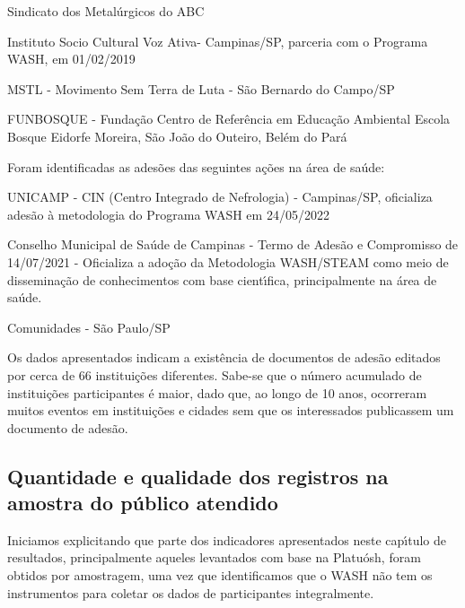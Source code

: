 \documentclass[
12pt,		%
openright,	%
twoside,  %
a4paper,			%
chapter=TITLE,		%
english,			%
french,				%
spanish,			%
brazil				%
]{USPSC-classe/USPSC}
\begin{document}
\begin{alineas}
\item Sindicato dos Metal\'urgicos do ABC
\item Instituto Socio Cultural Voz Ativa- Campinas/SP,  parceria com o Programa WASH, em 01/02/2019
\item MSTL - Movimento Sem Terra de Luta - S\~ao Bernardo do Campo/SP
\item FUNBOSQUE - Funda\c{c}\~ao Centro de Refer\^encia em Educa\c{c}\~ao Ambiental Escola Bosque Eidorfe Moreira, S\~ao Jo\~ao do Outeiro, Bel\'em do Par\'a
\end{alineas}

Foram identificadas as ades\~oes das seguintes a\c{c}\~oes na \'area de sa\'ude:









\begin{alineas}
\item UNICAMP - CIN (Centro Integrado de Nefrologia) - Campinas/SP, oficializa ades\~ao \`a metodologia do Programa WASH em 24/05/2022
\item Conselho Municipal de  Sa\'ude de Campinas - Termo de Ades\~ao e Compromisso de 14/07/2021 - Oficializa a ado\c{c}\~ao da Metodologia WASH/STEAM como meio de dissemina\c{c}\~ao de conhecimentos com base cient\'{\i}fica, principalmente na \'area de sa\'ude.
\item Comunidades - S\~ao Paulo/SP
\end{alineas}

Os dados apresentados indicam a exist\^encia de documentos de ades\~ao editados por cerca de 66 institui\c{c}\~oes diferentes. Sabe-se que o n\'umero acumulado de institui\c{c}\~oes participantes \'e maior, dado que, ao longo de 10 anos, ocorreram muitos eventos em institui\c{c}\~oes e cidades sem que os interessados publicassem um documento de ades\~ao.








\subsection[Quantidade e qualidade dos registros na amostra do p\'ublico atendido]{Quantidade e qualidade dos registros na amostra do p\'ublico atendido}\label{Quantidade e qualidade dos registros na amostra do p\'ublico atendido}
Iniciamos explicitando que parte dos indicadores apresentados neste cap\'{\i}tulo de resultados, principalmente aqueles levantados com base na Platu\'osh, foram obtidos por amostragem, uma vez que identificamos que o WASH n\~ao tem os instrumentos para coletar os dados de participantes integralmente.
\end{document}
